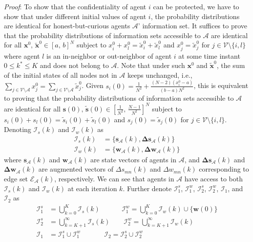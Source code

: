 \documentclass{IEEEtran}
\begin{document}
{\it Proof}: To show that the confidentiality of agent $i$ can be protected, we have to show that under different initial values of agent $i$, the probability distributions are identical for honest-but-curious agents $\mathcal{A}$' information set. It suffices to prove that the probability distributions of information sets accessible to $\mathcal{A}$ are identical for all $\mathbf{x}^0, \, \tilde{\mathbf{x}}^0 \in [a, \, b]^N$ subject to $x_i^0+x_l^0=\tilde{x}_i^0+\tilde{x}_l^0$ and $x_j^0=\tilde{x}_j^0$ for $j\in \mathcal{V}\setminus \{i,l\}$ where agent $l$ is an in-neighbor or out-neighbor of agent $i$ at some time instant $0\leq k^* \leq K$ and does not belong to $\mathcal{A}$. Note that under such $\mathbf{x}^0$ and $\tilde{\mathbf{x}}^0$, the sum of the initial states of all nodes not in $\mathcal{A}$ keeps unchanged, i.e., $\sum_{ j\in \mathcal{V}\setminus\mathcal{A}} x_j^0 = \sum_{ j\in \mathcal{V}\setminus\mathcal{A}} \tilde{x}_j^0$. Given $s_i(0)= \frac{1}{N^2} + \frac{(N-2)(x_i^0-a)}{(b-a)N^2}$, this is equivalent to proving that the probability distributions of information sets accessible to $\mathcal{A}$ are identical for all $\mathbf{s}(0), \, \tilde{\mathbf{s}}(0) \in [\frac{1}{N^2}, \, \frac{N-1}{N^2}]^N$ subject to $s_i(0) + s_l(0) = \tilde{s}_i(0) + \tilde{s}_l(0)$ and $s_j(0)=\tilde{s}_j(0)$ for $j\in \mathcal{V}\setminus \{i,l\}$. Denoting $\mathcal{I}_s(k)$ and $\mathcal{I}_w(k)$ as
\begin{equation}
	\begin{aligned}
		\mathcal{I}_s(k) & = \{ \mathbf{s}_{\mathcal{A}}(k), \boldsymbol{\Delta}\mathbf{s}_{\mathcal{A}}(k)\} \\
		\mathcal{I}_w(k) & = \{ \mathbf{w}_{\mathcal{A}}(k), \boldsymbol{\Delta}\mathbf{w}_{\mathcal{A}}(k)\}
	\end{aligned} 
\end{equation}
where $\mathbf{s}_{\mathcal{A}}(k)$ and $\mathbf{w}_{\mathcal{A}}(k)$ are state vectors of agents in $\mathcal{A}$, and $\boldsymbol{\Delta}\mathbf{s}_{\mathcal{A}}(k)$ and $\boldsymbol{\Delta}\mathbf{w}_{\mathcal{A}}(k)$ are augmented vectors of $\Delta s_{mn}(k)$ and $\Delta w_{mn}(k)$ corresponding to edge set $\mathcal{E_A}(k)$, respectively. We can see that agents in $\mathcal{A}$ have access to both $\mathcal{I}_s(k)$ and $\mathcal{I}_w(k)$ at each iteration $k$. Further denote $\mathcal{I}_1^s$, $\mathcal{I}_1^w$, $\mathcal{I}_2^s$, $\mathcal{I}_2^w$, $\mathcal{I}_1$, and $\mathcal{I}_2$ as
\begin{equation}
	\begin{aligned}
		\mathcal{I}_1^s & = \bigcup\limits_{k=0}^K \mathcal{I}_s(k) \qquad \quad \, \mathcal{I}_1^w = \bigcup\limits_{k=0}^K \mathcal{I}_w(k) \cup \{ \mathbf{w}(0)\} \\
		\mathcal{I}_2^s & = \bigcup\limits_{k=K+1}^{\infty} \mathcal{I}_s(k) \qquad \mathcal{I}_2^w = \bigcup\limits_{k=K+1}^{\infty} \mathcal{I}_w(k) \\
		\mathcal{I}_1 & = \mathcal{I}_1^s \cup \mathcal{I}_1^w \qquad \quad \ \ \mathcal{I}_2 = \mathcal{I}_2^s \cup \mathcal{I}_2^w 
	\end{aligned} 
\end{equation}
\end{document}
